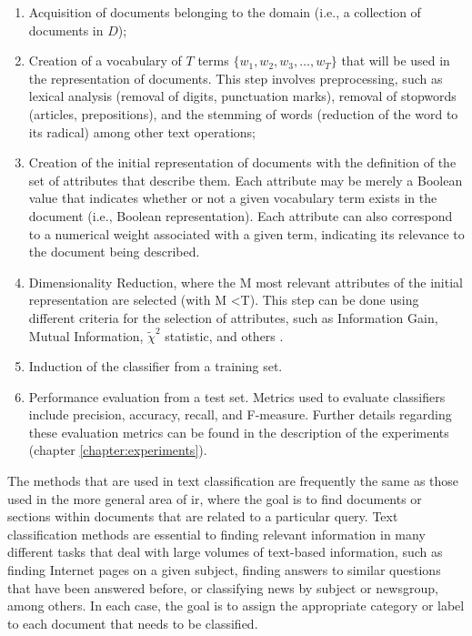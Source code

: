 \begin{enumerate}
\item  Acquisition of documents belonging to the domain (i.e.,
a collection of documents in $D$);
\item Creation of a vocabulary of $T$ terms  $\{w_1,w_2,w_3,\ldots,w_T\}$ that will be used in the representation of documents. This step involves preprocessing, such as lexical analysis (removal of digits, punctuation marks), removal of stopwords (articles, prepositions), and the stemming of words (reduction of the word to its radical) among other text operations;

\item Creation of the initial representation of documents with the definition of the set of attributes that describe them. Each attribute may be merely a Boolean value that indicates whether or not a given vocabulary term exists in the document (i.e., Boolean representation).  Each attribute can also correspond to a numerical weight associated with a given term, indicating its relevance to the document being described. 

\item Dimensionality Reduction, where the M most relevant attributes of the initial representation are selected (with M <T). This step can be done using different criteria for the selection of attributes, such as Information Gain, Mutual Information, $\tilde{\chi}^2$ statistic, and others \cite{Yang:1997}.

\item Induction of the classifier from a training set. %

\item Performance evaluation from a test set. Metrics used to evaluate classifiers include precision, accuracy,  recall, and F-measure. Further details regarding these evaluation metrics can be found in the description of the experiments (chapter \ref{chapter:experiments}).

\end{enumerate}


The methods that are used in text classification are frequently the same as those used in the more general area of \gls{ir}, where the goal is to find documents or sections within documents that are related to a particular query. Text classification methods are essential to finding relevant information in many different tasks that deal with large volumes of text-based information, such as finding Internet pages on a given subject, finding answers to similar questions that have been answered before, or classifying news by subject or newsgroup, among others. In each case, the goal is to assign the appropriate category or label to each document that needs to be classified.

